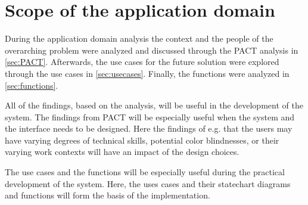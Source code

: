 \section{Scope of the application domain}

During the application domain analysis the context and the people of the overarching problem were analyzed and discussed through the PACT analysis in \cref{sec:PACT}.
Afterwards, the use cases for the future solution were explored through the use cases in \cref{sec:usecases}.
Finally, the functions were analyzed in \cref{sec:functions}.

All of the findings, based on the analysis, will be useful in the development of the system.
The findings from PACT will be especially useful when the system and the interface needs to be designed.
Here the findings of e.g. that the users may have varying degrees of technical skills, potential color blindnesses, or their varying work contexts will have an impact of the design choices.

The use cases and the functions will be especially useful during the practical development of the system.
Here, the uses cases and their statechart diagrams and functions will form the basis of the implementation.

